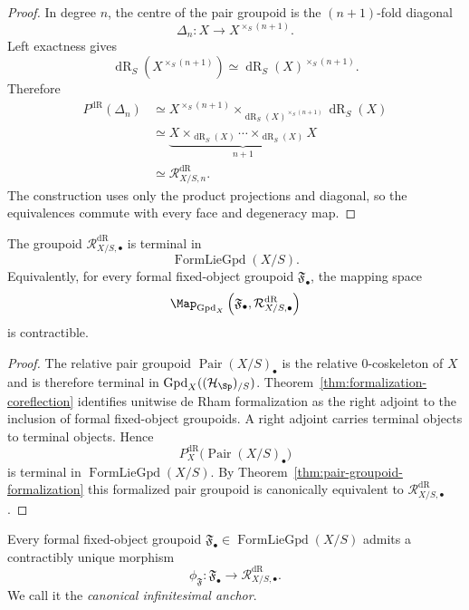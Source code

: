 \begin{proof}
In degree $n$, the centre of the pair groupoid is the $(n+1)$-fold diagonal
\[
    \Delta_n:X\longrightarrow X^{\times_S(n+1)}.
\]
Left exactness gives
\[
    \operatorname{dR}_S\!\left(X^{\times_S(n+1)}\right)
    \simeq
    \operatorname{dR}_S(X)^{\times_S(n+1)}.
\]
Therefore
\[
\begin{aligned}
    P^{\mathrm{dR}}(\Delta_n)
    &\simeq
    X^{\times_S(n+1)}
    \times_{\operatorname{dR}_S(X)^{\times_S(n+1)}}
    \operatorname{dR}_S(X)\\
    &\simeq
    \underbrace{
    X\times_{\operatorname{dR}_S(X)}\cdots\times_{\operatorname{dR}_S(X)}X
    }_{n+1}\\
    &\simeq
    \mathcal R^{\mathrm{dR}}_{X/S,n}.
\end{aligned}
\]
The construction uses only the product projections and diagonal, so the
equivalences commute with every face and degeneracy map.
\end{proof}

\begin{theorem}
\label{thm:maximal-formal-terminal}
The groupoid $\mathcal R^{\mathrm{dR}}_{X/S,\bullet}$ is terminal in
\[
    \operatorname{FormLieGpd}(X/S).
\]
Equivalently, for every formal fixed-object groupoid $\mathfrak F_\bullet$,
the mapping space
\[
    \Map_{\operatorname{Gpd}_X}
    \left(
        \mathfrak F_\bullet,
        \mathcal R^{\mathrm{dR}}_{X/S,\bullet}
    \right)
\]
is contractible.
\end{theorem}

\begin{proof}
The relative pair groupoid
$\operatorname{Pair}(X/S)_\bullet$ is the relative $0$-coskeleton of $X$ and
is therefore terminal in
$\operatorname{Gpd}_X((\mathcal H_{\Sp})_{/S})$.
Theorem~\ref{thm:formalization-coreflection} identifies unitwise de Rham formalization
as the right adjoint to the inclusion of formal fixed-object groupoids.
A right adjoint carries terminal objects to terminal objects.  Hence
\[
    P_X^{\mathrm{dR}}\bigl(\operatorname{Pair}(X/S)_\bullet\bigr)
\]
is terminal in
$\operatorname{FormLieGpd}(X/S)$.
By Theorem~\ref{thm:pair-groupoid-formalization} this formalized pair groupoid is
canonically equivalent to $\mathcal R^{\mathrm{dR}}_{X/S,\bullet}$.
\end{proof}


\begin{corollary}
\label{cor:canonical-formal-anchor}
Every formal fixed-object groupoid
$\mathfrak F_\bullet\in
\operatorname{FormLieGpd}(X/S)$
admits a contractibly unique morphism
\[
    \phi_{\mathfrak F}:
    \mathfrak F_\bullet
    \longrightarrow
    \mathcal R^{\mathrm{dR}}_{X/S,\bullet}.
\]
We call it the \emph{canonical infinitesimal anchor}.
\end{corollary}

